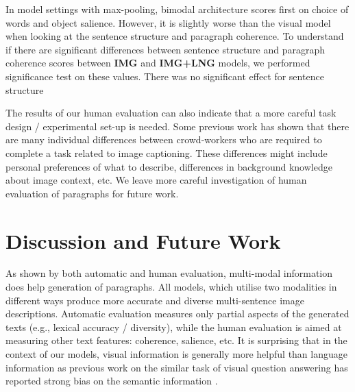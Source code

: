\documentclass[11pt,a4paper]{article}
\begin{document}
In model settings with max-pooling, bimodal architecture scores first on choice of words and object salience.
However, it is slightly worse than the visual model when looking at the sentence structure and paragraph coherence.
To understand if there are significant differences between sentence structure and paragraph coherence scores between \textbf{IMG} and \textbf{IMG+LNG} models, we performed significance test on these values.
There was no significant effect for sentence structure


The results of our human evaluation can also indicate that a more careful task design / experimental set-up is needed.
Some previous work \cite{vanmiltenburg2017} has shown that there are many individual differences between crowd-workers who are required to complete a task related to image captioning.
These differences might include personal preferences of what to describe, differences in background knowledge about image context, etc.
We leave more careful investigation of human evaluation of paragraphs for future work.



\section{Discussion and Future Work}

As shown by both automatic and human evaluation, multi-modal information does help generation of paragraphs.
All models, which utilise two modalities in different ways produce more accurate and diverse multi-sentence image descriptions.
Automatic evaluation measures only partial aspects of the generated texts (e.g., lexical accuracy / diversity), while the human evaluation is aimed at measuring other text features: coherence, salience, etc.
It is surprising that in the context of our models, visual information is generally more helpful than language information as previous work on the similar task of visual question answering has reported strong bias on the semantic information \cite{Agrawal:2017aa}.

\end{document}
